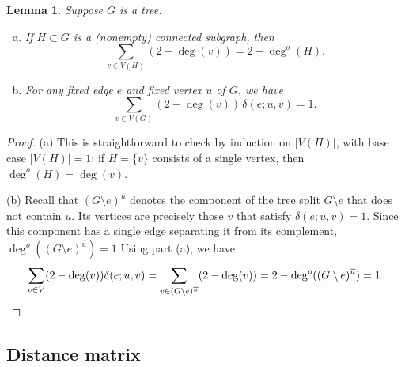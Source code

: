\documentclass{amsart}
\newtheorem{lem}[thm]{Lemma}
\theoremstyle{definition}
\newcommand{\degout}{\deg^o}
\begin{document}
\begin{lem}
\label{lem:outdeg-sum}
Suppose $G$ is a tree.
\begin{enumerate}[(a)]
\item 
If $H\subset G$ is a (nonempty) connected subgraph, then
\[
  \sum_{v \in V(H)} \left( 2 -  \deg(v) \right) = 2 - \degout(H) .
\]

\item 
For any fixed edge $e$ and fixed vertex $u$ of $G$, we have
\[
	\sum_{v \in V(G)} (2 - \deg(v))\, \delta(e; u,v) = 1.
\]

\end{enumerate}
\end{lem}
\begin{proof}
(a)
This is straightforward to check by induction on $|V(H)|$,
with base case $|V(H)| = 1$:
if $H = \{v\}$ consists of a single vertex, then $\degout(H) = \deg(v)$.
%

(b)
Recall that $(G \setminus e)^{\overline u}$ denotes the component of the tree split $G \setminus e$ that does not contain $u$.
Its vertices are precisely those $v$ that satisfy $\delta(e; u, v) = 1$.
Since this component has a single edge separating it from its complement, 
$\degout((G \setminus e)^{\overline u}) = 1$
Using part (a), we have
\[
	\sum_{v \in V} (2 - \deg(v)) \delta(e; u,v)
	= \sum_{v \in (G \setminus e)^{\overline u}} (2 - \deg(v))
	= 2 - \degout((G \setminus e)^{\overline u}) = 1. 
	\qedhere
\] 
\end{proof}

\subsection{Distance matrix}
\end{document}
